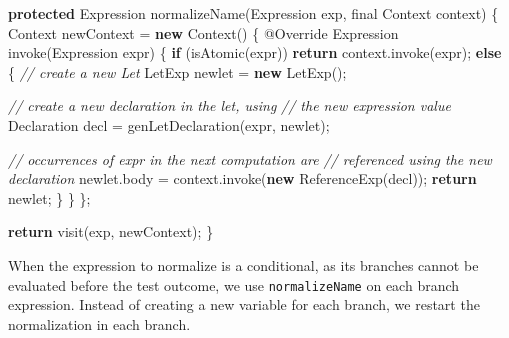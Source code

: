\documentclass[12pt,a4paper,oneside,openright]{book}
\newenvironment{Shaded}{\begin{snugshade}}{\end{snugshade}}
\newcommand{\KeywordTok}[1]{\textcolor[rgb]{0.13,0.29,0.53}{\textbf{{#1}}}}
\newcommand{\DataTypeTok}[1]{\textcolor[rgb]{0.13,0.29,0.53}{{#1}}}
\newcommand{\CommentTok}[1]{\textcolor[rgb]{0.56,0.35,0.01}{\textit{{#1}}}}
\newcommand{\FunctionTok}[1]{\textcolor[rgb]{0.00,0.00,0.00}{{#1}}}
\newcommand{\NormalTok}[1]{{#1}}
\begin{document}
\begin{Shaded}
\begin{Highlighting}[]
\KeywordTok{protected} \NormalTok{Expression }\FunctionTok{normalizeName}\NormalTok{(Expression exp,}
                                   \DataTypeTok{final} \NormalTok{Context context) \{}
    \NormalTok{Context newContext = }\KeywordTok{new} \NormalTok{Context() \{}
        \FunctionTok{@Override}
        \NormalTok{Expression }\FunctionTok{invoke}\NormalTok{(Expression expr) \{}
            \KeywordTok{if} \NormalTok{(}\FunctionTok{isAtomic}\NormalTok{(expr))}
                \KeywordTok{return} \NormalTok{context.}\FunctionTok{invoke}\NormalTok{(expr);}
            \KeywordTok{else} \NormalTok{\{}
                \CommentTok{// create a new Let}
                \NormalTok{LetExp newlet = }\KeywordTok{new} \FunctionTok{LetExp}\NormalTok{();}

                \CommentTok{// create a new declaration in the let, using}
                \CommentTok{// the new expression value}
                \NormalTok{Declaration decl = }\FunctionTok{genLetDeclaration}\NormalTok{(expr, newlet);}

                \CommentTok{// occurrences of expr in the next computation are}
                \CommentTok{// referenced using the new declaration}
                \NormalTok{newlet.}\FunctionTok{body} \NormalTok{= context.}\FunctionTok{invoke}\NormalTok{(}\KeywordTok{new} \FunctionTok{ReferenceExp}\NormalTok{(decl));}
                \KeywordTok{return} \NormalTok{newlet;}
            \NormalTok{\}}
        \NormalTok{\}}
    \NormalTok{\};}

    \KeywordTok{return} \FunctionTok{visit}\NormalTok{(exp, newContext);}
\NormalTok{\}}
\end{Highlighting}
\end{Shaded}

When the expression to normalize is a conditional, as its branches
cannot be evaluated before the test outcome, we use
\texttt{normalizeName} on each branch expression. Instead of creating a
new variable for each branch, we restart the normalization in each
branch.
\end{document}
